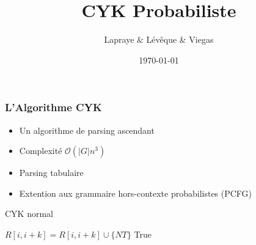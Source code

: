 \documentclass[table]{beamer}
\begin{document}
\title{CYK Probabiliste}  %
\author{Lapraye \& Lévêque \& Viegas}

\date{\today}


\begin{frame}
 \maketitle
\end{frame}

\begin{frame}
\frametitle{L'Algorithme CYK}
\begin{itemize}%
  \item{Un algorithme de parsing ascendant}
  \item{Complexité $\mathcal{O}(|G|n^3) $ } %
  \item{Parsing tabulaire}
  \item{Extention aux grammaire hors-contexte probabilistes (PCFG)}
 \end{itemize}
 
\begin{algorithm}[H]
	\caption{CYK normal}
	\tiny{\begin{algorithmic}
			    \EndIf 
			\EndFor
			
					    \ForAll{$ $}
							  \State $R[i,i+k] = R[i,i+k] \cup \{NT\}$
							\EndIf
						\EndFor
					    \EndFor
				      \EndFor
			      \EndFor
			  \EndFor
		      \EndFor
		  \Return True
		\EndIf
		\EndFunction
	\end{algorithmic}}
\end{algorithm}
\end{frame}
\end{document}
